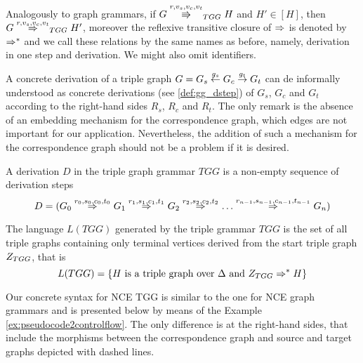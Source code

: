 \documentclass[]{report}
\begin{document}
\begin{definition}
	Analogously to graph grammars, if $G \cderiv{r}{v_s,v_c,v_t}{TGG} H$ and $H' \in [H]$, then $G \tderiv{r}{v_s,v_c,v_t}{TGG} H'$, moreover the reflexive transitive closure of $\tderiv{}{}{}$ is denoted by $\Rightarrow^*_{}$ and we call these relations by the same names as before, namely, derivation in one step and derivation. We might also omit identifiers.
\end{definition}

A concrete derivation of a triple graph $G = G_s \overset{g_s}{\leftarrow} G_c \overset{g_t}{\rightarrow} G_t$ can de informally understood as concrete derivations (see \ref{def:gg_dstep}) of $G_s$, $G_c$ and $G_t$ according to the right-hand sides $R_s$, $R_c$ and $R_t$. The only remark is the absence of an embedding mechanism for the correspondence graph, which edges are not important for our application. Nevertheless, the addition of such a mechanism for the correspondence graph should not be a problem if it is desired.

\begin{definition}
	A derivation $D$ in the triple graph grammar $TGG$ is a non-empty sequence of derivation steps
	\[ 
	D = (G_0 \tderiv{r_0}{s_0,c_0,t_0}{} G_1 \tderiv{r_1}{s_1,c_1,t_1}{} G_2 \tderiv{r_2}{s_2,c_2,t_2}{} \dots \tderiv{r_{n-1}}{s_{n-1},c_{n-1},t_{n-1}}{} G_n)
	\]
\end{definition}

\begin{definition}
	\label{def:tlanguage}
	The language $L(TGG)$ generated by the triple grammar $TGG$ is the set of all triple graphs containing only terminal vertices derived from the start triple graph $Z_{TGG}$, that is
	\[
	L(TGG) = \{H \text{ is a triple graph over } \Delta \text{ and } Z_{TGG} \Rightarrow^*_{} H\}
	\]
\end{definition}

Our concrete syntax for NCE TGG is similar to the one for NCE graph grammars and is presented below by means of the Example \ref{ex:pseudocode2controlflow}. The only difference is at the right-hand sides, that include the morphisms between the correspondence graph and source and target graphs depicted with dashed lines.
\end{document}
